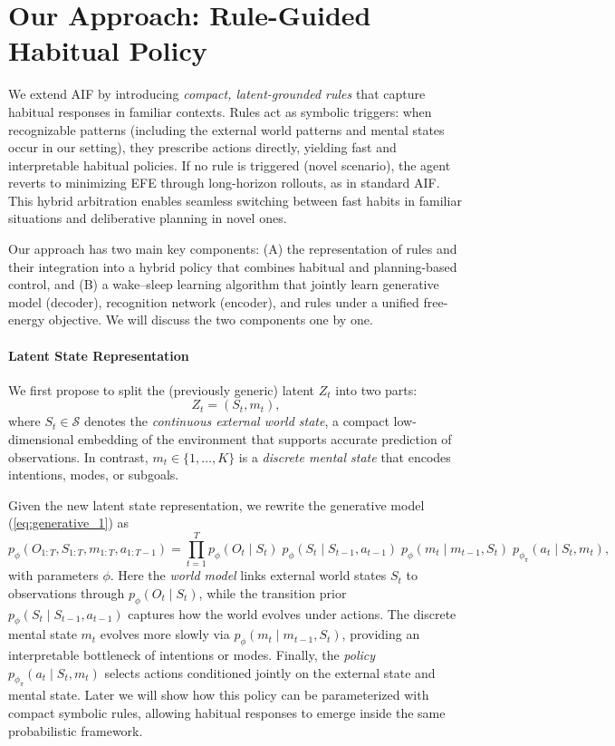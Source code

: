 \documentclass{article} %
\begin{document}
\section{Our Approach: Rule-Guided Habitual Policy}
\label{sec:method}
We extend AIF by introducing \emph{compact, latent-grounded rules} that capture habitual responses in familiar contexts.  
Rules act as symbolic triggers: when recognizable patterns (including the external world patterns and mental states occur in our setting), they prescribe actions directly, yielding fast and interpretable habitual policies.  
If no rule is triggered (novel scenario), the agent reverts to minimizing EFE through long-horizon rollouts, as in standard AIF.  
This hybrid arbitration enables seamless switching between fast habits in familiar situations and deliberative planning in novel ones.  

Our approach has two main key components: 
(A) the representation of rules and their integration into a hybrid policy that combines habitual and planning-based control, and 
(B) a wake--sleep learning algorithm that jointly learn 
generative model (decoder), recognition network (encoder), and rules under a unified free-energy objective. We will discuss the two components one by one. 

\paragraph{Latent State Representation} We first propose to split the (previously generic) latent \(Z_t\) into two parts:
\[
Z_t = (S_t, m_t),
\]
where \(S_t\in\mathcal S\) denotes the \emph{continuous external world state}, a compact low-dimensional embedding of the environment that supports accurate prediction of observations.  
In contrast, \(m_t \in \{1,\dots,K\}\) is a \emph{discrete mental state} that encodes intentions, modes, or subgoals.  

Given the new latent state representation, we rewrite the generative model (\ref{eq:generative_1}) as
{\small \[
p_\phi(O_{1:T},S_{1:T},m_{1:T},a_{1:T-1})
=\prod_{t=1}^T 
p_\phi(O_t\mid S_t)\;
p_\phi(S_t\mid S_{t-1},a_{t-1})\;
p_\phi(m_t\mid m_{t-1},S_t)\;
p_{\phi_{\pi}}(a_t\mid S_t,m_t),
\]}
with parameters \(\phi\). Here the \emph{world model} links external world states \(S_t\) to observations through \(p_\phi(O_t\mid S_t)\), while the transition prior \(p_\phi(S_t\mid S_{t-1},a_{t-1})\) captures how the world evolves under actions.  
The discrete mental state \(m_t\) evolves more slowly via \(p_\phi(m_t\mid m_{t-1},S_t)\), providing an interpretable bottleneck of intentions or modes.  
Finally, the \emph{policy} \(p_{\phi_{\pi}}(a_t\mid S_t,m_t)\) selects actions conditioned jointly on the external state and mental state. Later we will show how this policy can be parameterized with compact symbolic rules, allowing habitual responses to emerge inside the same probabilistic framework.  
\end{document}
